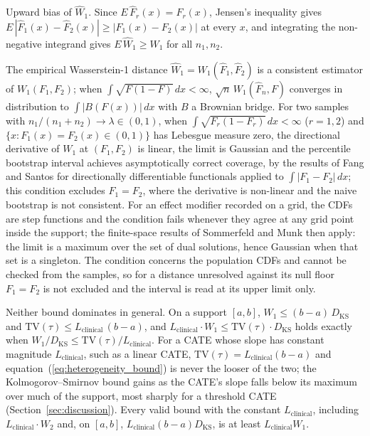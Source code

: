 \documentclass[AMA,Times1COL]{WileyNJDv5}
\begin{document}
Upward bias of $\widehat{W}_1$. Since $E\,\hat{F}_r(x) = F_r(x)$, Jensen's inequality gives $E\,|\hat{F}_1(x) - \hat{F}_2(x)| \geq |F_1(x) - F_2(x)|$ at every $x$, and integrating the non-negative integrand gives $E\,\widehat{W}_1 \geq W_1$ for all $n_1, n_2$.

The empirical Wasserstein-1 distance $\widehat{W}_1 = W_1(\hat{F}_1, \hat{F}_2)$ is a consistent estimator of $W_1(F_1, F_2)$; when $\int \sqrt{F(1-F)}\,dx < \infty$, $\sqrt{n}\,W_1(\hat{F}_n, F)$ converges in distribution to $\int |B(F(x))|\,dx$ with $B$ a Brownian bridge.\cite{delbarrio1999} For two samples with $n_1/(n_1+n_2) \to \lambda \in (0,1)$, when $\int \sqrt{F_r(1-F_r)}\,dx < \infty$ ($r = 1, 2$) and $\{x : F_1(x) = F_2(x) \in (0,1)\}$ has Lebesgue measure zero, the directional derivative of $W_1$ at $(F_1, F_2)$ is linear, the limit is Gaussian and the percentile bootstrap interval achieves asymptotically correct coverage, by the results of Fang and Santos for directionally differentiable functionals applied to $\int |F_1 - F_2|\,dx$;\cite{fang2019} this condition excludes $F_1 = F_2$, where the derivative is non-linear and the naive bootstrap is not consistent.\cite{dumbgen1993} For an effect modifier recorded on a grid, the CDFs are step functions and the condition fails whenever they agree at any grid point inside the support; the finite-space results of Sommerfeld and Munk then apply:\cite{sommerfeld2018} the limit is a maximum over the set of dual solutions, hence Gaussian when that set is a singleton. The condition concerns the population CDFs and cannot be checked from the samples, so for a distance unresolved against its null floor $F_1 = F_2$ is not excluded and the interval is read at its upper limit only.


Neither bound dominates in general. On a support $[a, b]$, $W_1 \leq (b - a)\,D_{\text{KS}}$ and $\mathrm{TV}(\tau) \leq L_{\text{clinical}}\,(b - a)$, and $L_{\text{clinical}} \cdot W_1 \leq \mathrm{TV}(\tau) \cdot D_{\text{KS}}$ holds exactly when $W_1 / D_{\text{KS}} \leq \mathrm{TV}(\tau) / L_{\text{clinical}}$. For a CATE whose slope has constant magnitude $L_{\text{clinical}}$, such as a linear CATE, $\mathrm{TV}(\tau) = L_{\text{clinical}}(b - a)$ and equation~(\ref{eq:heterogeneity_bound}) is never the looser of the two; the Kolmogorov--Smirnov bound gains as the CATE's slope falls below its maximum over much of the support, most sharply for a threshold CATE (Section~\ref{sec:discussion}). Every valid bound with the constant $L_{\text{clinical}}$, including $L_{\text{clinical}} \cdot W_2$ and, on $[a, b]$, $L_{\text{clinical}} (b - a) D_{\text{KS}}$, is at least $L_{\text{clinical}} W_1$.%
\end{document}
